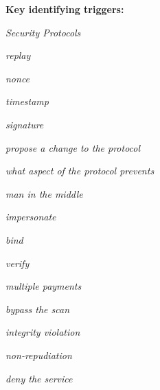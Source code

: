 \documentclass[12pt, a4paper]{article}
\begin{document}
\textbf{Key identifying triggers:}
\begin{tightitem}
        \item \textit{Security Protocols}
        \item \textit{replay}
        \item \textit{nonce}
        \item \textit{timestamp}
        \item \textit{signature}
        \item \textit{propose a change to the protocol}
        \item \textit{what aspect of the protocol prevents}
        \item \textit{man in the middle}
        \item \textit{impersonate}
        \item \textit{bind}
        \item \textit{verify}
        \item \textit{multiple payments}
        \item \textit{bypass the scan}
        \item \textit{integrity violation}
        \item \textit{non-repudiation}
        \item \textit{deny the service}
    \end{tightitem}
\end{document}
